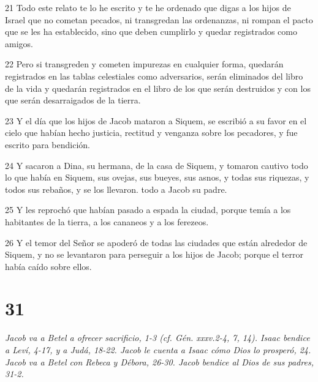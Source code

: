 \par 21 Todo este relato te lo he escrito y te he ordenado que digas a los hijos de Israel que no cometan pecados, ni transgredan las ordenanzas, ni rompan el pacto que se les ha establecido, sino que deben cumplirlo y quedar registrados como amigos.
\par 22 Pero si transgreden y cometen impurezas en cualquier forma, quedarán registrados en las tablas celestiales como adversarios, serán eliminados del libro de la vida y quedarán registrados en el libro de los que serán destruidos y con los que serán desarraigados de la tierra.
\par 23 Y el día que los hijos de Jacob mataron a Siquem, se escribió a su favor en el cielo que habían hecho justicia, rectitud y venganza sobre los pecadores, y fue escrito para bendición.
\par 24 Y sacaron a Dina, su hermana, de la casa de Siquem, y tomaron cautivo todo lo que había en Siquem, sus ovejas, sus bueyes, sus asnos, y todas sus riquezas, y todos sus rebaños, y se los llevaron. todo a Jacob su padre.
\par 25 Y les reprochó que habían pasado a espada la ciudad, porque temía a los habitantes de la tierra, a los cananeos y a los ferezeos.
\par 26 Y el temor del Señor se apoderó de todas las ciudades que están alrededor de Siquem, y no se levantaron para perseguir a los hijos de Jacob; porque el terror había caído sobre ellos.

\chapter{31}

\par \textit{Jacob va a Betel a ofrecer sacrificio, 1-3 (cf. Gén. xxxv.2-4, 7, 14). Isaac bendice a Leví, 4-17, y a Judá, 18-22. Jacob le cuenta a Isaac cómo Dios lo prosperó, 24. Jacob va a Betel con Rebeca y Débora, 26-30. Jacob bendice al Dios de sus padres, 31-2.}


